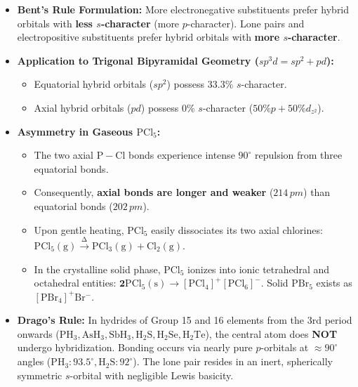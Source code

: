 \documentclass[10pt,twoside,openright]{book}
\begin{document}
\begin{conceptbox}
\begin{itemize}
  \item \textbf{Bent's Rule Formulation:} More electronegative substituents prefer hybrid orbitals with \textbf{less $s$-character} (more $p$-character). Lone pairs and electropositive substituents prefer hybrid orbitals with \textbf{more $s$-character}.
  \item \textbf{Application to Trigonal Bipyramidal Geometry ($sp^3d = sp^2 + pd$):}
  \begin{itemize}
    \item Equatorial hybrid orbitals ($sp^2$) possess $33.3\%$ $s$-character.
    \item Axial hybrid orbitals ($pd$) possess $0\%$ $s$-character ($50\% p + 50\% d_{z^2}$).
  \end{itemize}
  \item \textbf{Asymmetry in Gaseous $\mathrm{PCl_5}$:}
  \begin{itemize}
    \item The two axial $\mathrm{P-Cl}$ bonds experience intense $90^\circ$ repulsion from three equatorial bonds.
    \item Consequently, \textbf{axial bonds are longer and weaker} ($214\,\si{pm}$) than equatorial bonds ($202\,\si{pm}$).
    \item Upon gentle heating, $\mathrm{PCl_5}$ easily dissociates its two axial chlorines: $\mathrm{PCl_5(g) \xrightarrow{\Delta} PCl_3(g) + Cl_2(g)}$.
    \item In the crystalline solid phase, $\mathrm{PCl_5}$ ionizes into ionic tetrahedral and octahedral entities: $\mathbf{2\mathrm{PCl_5(s)} \longrightarrow [\mathrm{PCl_4}]^+[\mathrm{PCl_6}]^-}$. Solid $\mathrm{PBr_5}$ exists as $[\mathrm{PBr_4}]^+\mathrm{Br^-}$.
  \end{itemize}
  \item \textbf{Drago's Rule:}
  In hydrides of Group 15 and 16 elements from the 3rd period onwards ($\mathrm{PH_3, AsH_3, SbH_3, H_2S, H_2Se, H_2Te}$), the central atom does \textbf{NOT} undergo hybridization. Bonding occurs via nearly pure $p$-orbitals at $\approx 90^\circ$ angles ($\mathrm{PH_3}: 93.5^\circ, \mathrm{H_2S}: 92^\circ$). The lone pair resides in an inert, spherically symmetric $s$-orbital with negligible Lewis basicity.
\end{itemize}
\end{conceptbox}
\end{document}
